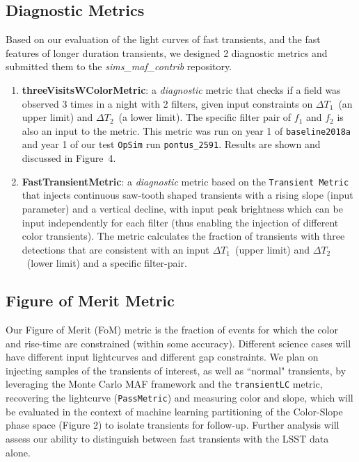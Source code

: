 \documentclass[12pt, letterpaper]{article}
\newcommand{\dtone}{\ensuremath{\Delta T_1}}
\newcommand{\dttwo}{\ensuremath{\Delta T_2}}
\begin{document}
\subsection{Diagnostic Metrics}

Based on our evaluation of the light curves of fast transients, and the fast features of longer duration transients, we designed 2 diagnostic metrics and submitted them to the {\em sims\_maf\_contrib } repository.

\begin{enumerate}
\vspace{-0.15in}
\item
{\bf threeVisitsWColorMetric}: a {\it diagnostic} metric that checks if a field was observed 3 times in a night with 2 filters, given input constraints on \dtone\ (an upper limit) and \dttwo\ (a lower limit). The specific filter pair of $f_1$ and $f_2$ is also an input to the metric. This metric was run on year 1 of {\tt baseline2018a} and year 1 of our test {\tt OpSim} run {\tt pontus\_2591}. Results are shown and discussed in Figure~4.
\item
\vspace{-0.1in}
{\bf FastTransientMetric}: a {\it diagnostic} metric based on the {\tt Transient Metric} that injects continuous saw-tooth shaped transients with a rising slope (input parameter) and a vertical decline, with input peak brightness which can be input independently for each filter (thus enabling the injection of different color transients). The metric calculates the fraction of transients with three detections that are consistent with an input \dtone\ (upper limit) and \dttwo\ (lower limit) and a specific filter-pair.

\end{enumerate}
\vspace{-0.2in}

\subsection{Figure of Merit Metric}

Our Figure of Merit (FoM) metric is the fraction of events for which the color and rise-time are constrained (within some accuracy). Different science cases will have different input lightcurves and different gap constraints. We plan on injecting samples of the transients of interest, as well as ``normal" transients, by leveraging the Monte Carlo MAF framework and the {\tt transientLC} metric, recovering the lightcurve ({\tt PassMetric}) and measuring color and slope, which will be evaluated in the context of  machine learning partitioning of the Color-Slope phase space (Figure 2) to isolate transients for follow-up. Further analysis will assess our ability to distinguish between fast transients with the LSST data alone.
\end{document}
